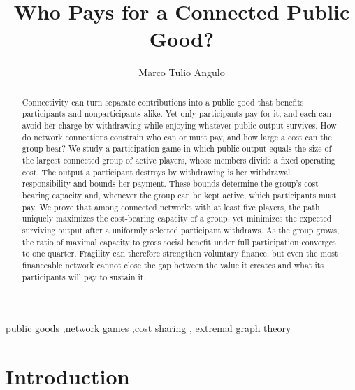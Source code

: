 \documentclass[preprint,12pt,authoryear]{elsarticle}
\begin{document}
\begin{frontmatter}

\title{Who Pays for a Connected Public Good?}

\author[aff1]{Marco Tulio Angulo}
\address[aff1]{Institute of Mathematics, Universidad Nacional Aut\'onoma de M\'exico, M\'exico}

\begin{abstract}
Connectivity can turn separate contributions into a public good that benefits
participants and nonparticipants alike. Yet only participants pay for it, and each can
avoid her charge by withdrawing while enjoying whatever public output survives. How
do network connections constrain who can or must pay, and how large a cost can
the group bear? We study a participation game in which public output equals the size of the largest connected group of active players, whose members divide a fixed operating cost. The output a participant destroys by withdrawing is her withdrawal responsibility and bounds her payment. These bounds determine the group's cost-bearing capacity and, whenever the group can be kept active, which participants must pay.
We prove that among connected networks with at least five players, the path uniquely maximizes the cost-bearing capacity of a group, yet minimizes the expected surviving output after a uniformly selected participant withdraws. As the group grows, the ratio of maximal capacity to gross social benefit under full participation converges to one quarter. Fragility can therefore strengthen voluntary finance, but even the most financeable network cannot close the gap between the value it creates and what its participants will pay to sustain it.
\end{abstract}

\begin{keyword}
public goods \sep network games \sep cost sharing \sep
extremal graph theory
\end{keyword}

\end{frontmatter}


\section{Introduction}
\label{sec:introduction}
\end{document}
